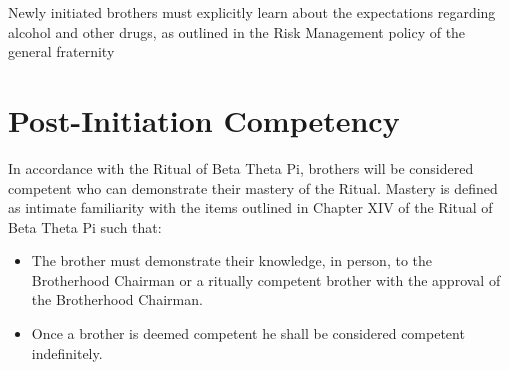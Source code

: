 Newly initiated brothers must explicitly learn about the expectations regarding
alcohol and other drugs, as outlined in the Risk Management policy of the
general fraternity

\section{Post-Initiation Competency}

In accordance with the Ritual of Beta Theta Pi, brothers will be considered
competent who can demonstrate their mastery of the Ritual.
Mastery is defined as intimate familiarity with the items outlined in Chapter
XIV of the Ritual of Beta Theta Pi such that:
\begin{itemize}
    \item The brother must demonstrate their knowledge, in person, to the
        Brotherhood Chairman or a ritually competent brother with the approval
        of the Brotherhood Chairman.
    \item Once a brother is deemed competent he shall be considered competent
        indefinitely.
\end{itemize}

